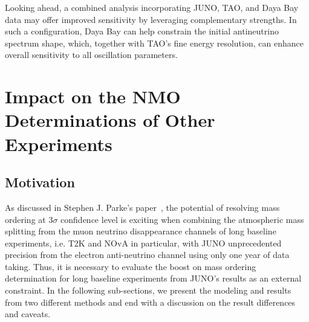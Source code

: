 Looking ahead, a combined analysis incorporating JUNO, TAO, and Daya Bay data may offer improved
sensitivity by leveraging complementary strengths. In such a configuration, Daya Bay can help
constrain the initial antineutrino spectrum shape, which, together with TAO’s fine energy
resolution, can enhance overall sensitivity to all oscillation parameters.





\section{Impact on the NMO Determinations of Other Experiments}\label{sec:nmoimpact}

\subsection{Motivation} %
As discussed in Stephen J. Parke's paper~\cite{Parke:2024xre}, the potential of resolving mass ordering at 3$\sigma$ confidence level is exciting when combining the atmospheric mass splitting from the muon neutrino disappearance channels of long baseline experiments, i.e. T2K and NOvA in particular, with JUNO unprecedented precision from the electron anti-neutrino channel using only one year of data taking. Thus, it is necessary to evaluate the boost on mass ordering determination for long baseline experiments from JUNO's results as an external constraint. In the following sub-sections, we present the modeling and results from two different methods and end with a discussion on the result differences and caveats.
